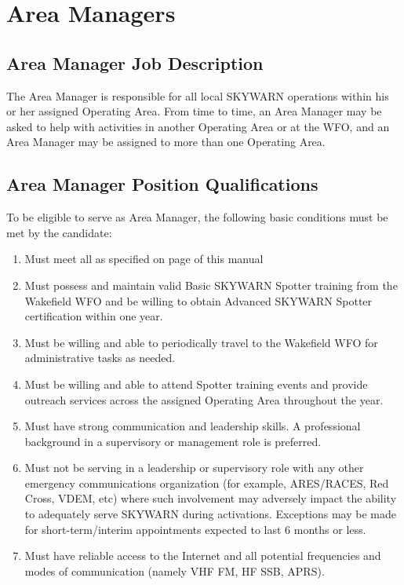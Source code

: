 \documentclass[pdflatex,letterpaper,twoside,12pt]{book}
\begin{document}

\section{Area Managers}

\subsection{Area Manager Job Description}\label{am-jobdesc}

The Area Manager is responsible for all local SKYWARN operations within his or her assigned Operating Area.  From time to time, an Area Manager may be asked to help with activities in another Operating Area or at the WFO, and an Area Manager may be assigned to more than one Operating Area. 

\subsection{Area Manager Position Qualifications}

To be eligible to serve as Area Manager, the following basic conditions must be met by the candidate:

\begin{enumerate}
\item Must meet all  as specified on page \pageref{nco-criteria} of this manual
\item Must possess and maintain valid Basic SKYWARN Spotter training from the Wakefield WFO and be willing to obtain Advanced SKYWARN Spotter certification within one year.
\item Must be willing and able to periodically travel to the Wakefield WFO for administrative tasks as needed.
\item Must be willing and able to attend Spotter training events and provide outreach services across the assigned Operating Area throughout the year.
\item Must have strong communication and leadership skills.  A professional background in a supervisory or management role is preferred.
\item Must not be serving in a leadership or supervisory role with any other emergency communications organization (for example, ARES/RACES, Red Cross, VDEM, etc) where such involvement may adversely impact the ability to adequately serve SKYWARN during activations.  Exceptions may be made for short-term/interim appointments expected to last 6 months or less.
\item Must have reliable access to the Internet and all potential frequencies and modes of communication (namely VHF FM, HF SSB, APRS).
\end{enumerate}
\end{document}
